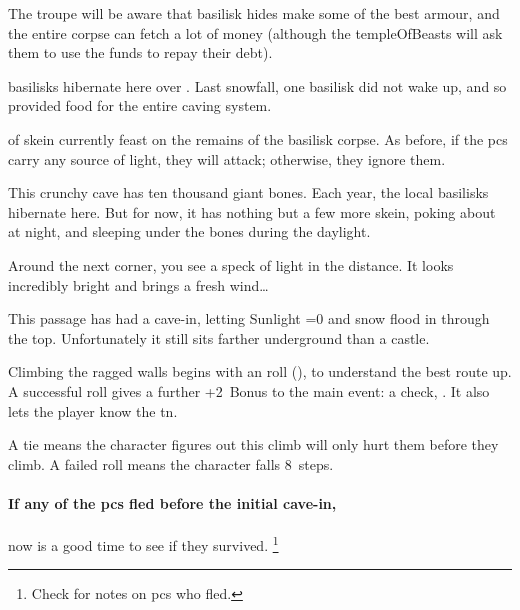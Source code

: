\begin{multicols}{2}
  The troupe will be aware that \gls{basilisk} hides make some of the best armour, and the entire corpse can fetch a lot of money (although the \gls{templeOfBeasts} will ask them to use the funds to repay their debt).

\or%
  \Glspl{basilisk} hibernate here over .
  Last snowfall, one \gls{basilisk} did not wake up, and so provided food for the entire caving system.

   of skein currently feast on the remains of the \gls{basilisk} corpse.
  As before, if the \glspl{pc} carry any source of light, they will attack; otherwise, they ignore them.

  \skeinSwarm
\else
  This crunchy cave has ten thousand giant bones.
  Each year, the local \glspl{basilisk} hibernate here.
  But for now, it has nothing but a few more skein, poking about at night, and sleeping under the bones during the daylight.

  \skeinSwarm
\fi

\ifnum{}\else
  \begin{boxtext}
    Around the next corner, you see a speck of light in the distance.
    It looks incredibly bright and brings a fresh wind\ldots
  \end{boxtext}
\fi



This passage has had a cave-in, letting Sunlight \ifnum\value{temperature}=0 and snow \fi flood in through the top.
Unfortunately it still sits farther underground than a castle.

Climbing the ragged walls begins with an  roll (\tn[10]), to understand the best route up.
A successful roll gives a further +2~Bonus to the main event: a  check, \tn[14].
It also lets the player know the \gls{tn}.

A tie means the character figures out this climb will only hurt them before they climb.
A failed roll means the character falls 8~\glspl{step}.%

\paragraph{If any of the \glspl{pc} fled before the initial cave-in,}
now is a good time to see if they survived.%
\footnote{Check  for notes on \glspl{pc} who fled.}


\end{multicols}
